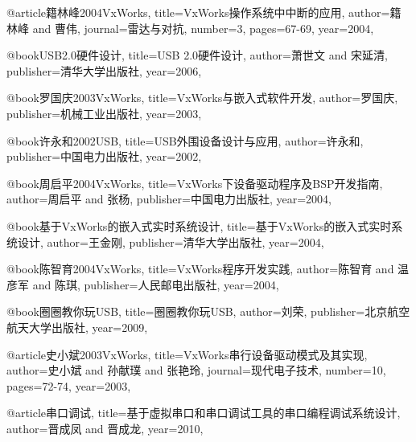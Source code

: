 @article{籍林峰2004VxWorks,
  title={VxWorks操作系统中中断的应用},
  author={籍林峰 and 曹伟},
  journal={雷达与对抗},
  number={3},
  pages={67-69},
  year={2004},
}


@book{USB2.0硬件设计,
  title={USB 2.0硬件设计},
  author={萧世文 and 宋延清},
  publisher={清华大学出版社},
  year={2006},
}


@book{罗国庆2003VxWorks,
  title={VxWorks与嵌入式软件开发},
  author={罗国庆},
  publisher={机械工业出版社},
  year={2003},
}


@book{许永和2002USB,
  title={USB外围设备设计与应用},
  author={许永和},
  publisher={中国电力出版社},
  year={2002},
}


@book{周启平2004VxWorks,
  title={VxWorks下设备驱动程序及BSP开发指南},
  author={周启平 and 张杨},
  publisher={中国电力出版社},
  year={2004},
}

@book{基于VxWorks的嵌入式实时系统设计,
  title={基于VxWorks的嵌入式实时系统设计},
  author={王金刚},
  publisher={清华大学出版社},
  year={2004},
}

@book{陈智育2004VxWorks,
  title={VxWorks程序开发实践},
  author={陈智育 and 温彦军 and 陈琪},
  publisher={人民邮电出版社},
  year={2004},
}


@book{圈圈教你玩USB,
  title={圈圈教你玩USB},
  author={刘荣},
  publisher={北京航空航天大学出版社},
  year={2009},
}

@article{史小斌2003VxWorks,
  title={VxWorks串行设备驱动模式及其实现},
  author={史小斌 and 孙献璞 and 张艳玲},
  journal={现代电子技术},
  number={10},
  pages={72-74},
  year={2003},
}


@article{串口调试,
  title={基于虚拟串口和串口调试工具的串口编程调试系统设计},
  author={晋成凤 and 晋成龙},
  year={2010},
}













